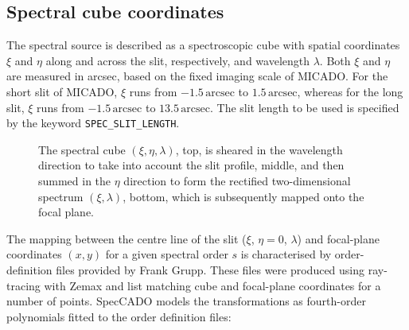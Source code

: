 \documentclass[a4paper,twoside,11pt]{article}
\begin{document}
\subsection{Spectral cube coordinates}
\label{ssec:cube_coordinates}

The spectral source is described as a spectroscopic cube with spatial
coordinates $\xi$ and $\eta$ along and across the slit, respectively,
and wavelength $\lambda$. Both $\xi$ and $\eta$ are measured in
arcsec, based on the fixed imaging scale of MICADO. For the short slit
of MICADO, $\xi$ runs from $-1.5\,\mathrm{arcsec}$ to
$1.5\,\mathrm{arcsec}$, whereas for the long slit, $\xi$ runs from
$-1.5\,\mathrm{arcsec}$ to $13.5\,\mathrm{arcsec}$. The slit length to
be used is specified by the keyword \lstinline{SPEC_SLIT_LENGTH}.

\begin{figure}
  \centering
  \caption{The spectral cube $(\xi, \eta, \lambda)$, top, is sheared
    in the wavelength direction to take into account the slit profile,
    middle, and then summed in the $\eta$ direction to form the
    rectified two-dimensional spectrum $(\xi, \lambda)$, bottom, which
    is subsequently mapped onto the focal plane.}
  \label{fig:cube_collapse}
\end{figure}

The mapping between the centre line of the slit ($\xi$, $\eta=0$,
$\lambda$) and focal-plane coordinates $(x, y)$ for a given spectral
order $s$ is characterised by order-definition files provided by Frank
Grupp. These files were produced using ray-tracing with Zemax and list
matching cube and focal-plane coordinates for a number of
points. SpecCADO models the transformations as fourth-order
polynomials fitted to the order definition files:
\end{document}
